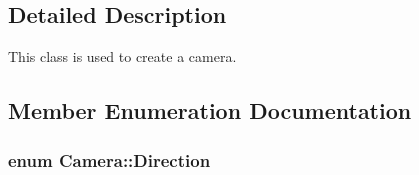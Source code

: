 \subsection{Detailed Description}
This class is used to create a camera. 

\subsection{Member Enumeration Documentation}
\subsubsection[{\texorpdfstring{Direction}{Direction}}]{\setlength{\rightskip}{0pt plus 5cm}enum {\bf Camera\+::\+Direction}\hspace{0.3cm}{\ttfamily [private]}}\hypertarget{class_camera_a80cb65605322d27ad3b6d973484509ec}{}\label{class_camera_a80cb65605322d27ad3b6d973484509ec}
